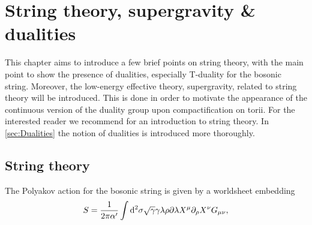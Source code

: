 \chapter{String theory, supergravity \& dualities}


This chapter aims to introduce a few brief points on string theory, with the main point to show the presence of dualities, especially T-duality for the bosonic string. Moreover, the low-energy effective theory, supergravity, related to string theory will be introduced. This is done in order to motivate the appearance of the continuous version of the duality group upon compactification on torii. For the interested reader we recommend \cite{Blumenhagen2013,TongLectureNotes} for an introduction to string theory. In \ref{sec:Dualities} the notion of dualities is introduced more thoroughly. 


\section{String theory}
The Polyakov action for the bosonic string is given by a worldsheet embedding
\begin{equation}
    S = \frac{1}{2\pi\alpha'}\int \mathrm{d}^2\sigma \sqrt{\gamma}\gamma{\lambda\rho}\partial\lambda X^\mu\partial_\rho X^\nu G_{\mu\nu},
\end{equation}


